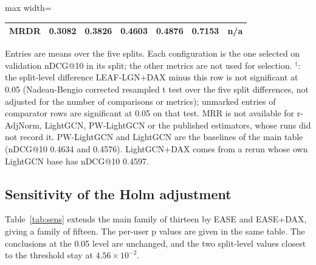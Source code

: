 \documentclass[preprint,12pt,authoryear]{elsarticle}
\begin{document}
\begin{table}[tbp]
\begin{adjustbox}{max width=\linewidth}
\begin{tabular}{lcccccc}
MRDR & 0.3082 & 0.3826 & 0.4603 & 0.4876 & 0.7153 & n/a \\
\bottomrule
\end{tabular}
\end{adjustbox}
\par\smallskip
\begin{minipage}{\linewidth}\raggedright\footnotesize Entries are means over the five splits. Each configuration is the one selected on validation nDCG@10 in its split; the other metrics are not used for selection. $^{\dagger}$: the split-level difference LEAF-LGN+DAX minus this row is not significant at 0.05 (Nadeau-Bengio corrected resampled t test over the five split differences, not adjusted for the number of comparisons or metrics); unmarked entries of comparator rows are significant at 0.05 on that test. MRR is not available for r-AdjNorm, LightGCN, PW-LightGCN or the published estimators, whose runs did not record it. PW-LightGCN and LightGCN are the baselines of the main table (nDCG@10 0.4634 and 0.4576). LightGCN+DAX comes from a rerun whose own LightGCN base has nDCG@10 0.4597.\end{minipage}
\end{table}


\subsection{Sensitivity of the Holm adjustment}\label{app:sens}

Table~\ref{tab:sens} extends the main family of thirteen by EASE and EASE+DAX, giving a family of fifteen. The per-user p values are given in the same table.
The conclusions at the 0.05 level are unchanged, and the two split-level values closest to the threshold stay at $4.56\times10^{-2}$.
\end{document}
